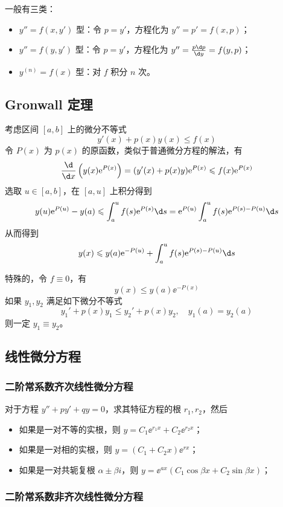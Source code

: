 一般有三类：

\begin{itemize}
	\item $y'' = f(x, y')$ 型：令 $p = y'$，方程化为 $y'' = p' = f(x, p)$；
	\item $y'' = f(y, y')$ 型：令 $p = y'$，方程化为 $y'' = \frac{p \d p}{\d y} = f(y, p)$；
	\item $y^{(n)} = f(x)$ 型：对 $f$ 积分 $n$ 次。
\end{itemize}

\subsection{Gronwall 定理}

考虑区间 $[a, b]$ 上的微分不等式
\[ y'(x) + p(x) y(x) \leqslant f(x) \]
令 $P(x)$ 为 $p(x)$ 的原函数，类似于普通微分方程的解法，有
\[ \frac{\d }{\d x} \left(y(x) \ee^{P(x)}\right) = (y'(x) + p(x) y) \ee^{P(x)} \leqslant f(x) \ee^{P(x)} \]
选取 $u \in [a, b]$，在 $[a, u]$ 上积分得到
\[ y(u) \ee^{P(u)} - y(a) \leqslant \int_{a}^{u} f(s) \ee^{P(s)} \d s = \ee^{P(u)} \int_{a}^{u} f(s) \ee^{P(s) - P(u)} \d s  \]
从而得到
\[ y(x) \leqslant y(a) \ee^{-P(u)} + \int_{a}^{u} f(s) \ee^{P(s) - P(u)} \d s \]

特殊的，令 $f \equiv 0$，有
\[ y(x) \leqslant y(a) \ee^{-P(x)} \]
如果 $y_1, y_2$ 满足如下微分不等式
\[ y_1' + p(x) y_1 \leqslant y_2' + p(x) y_2, \quad y_1(a) = y_2(a) \]
则一定 $y_1 \equiv y_2$。

\subsection{线性微分方程}

\subsubsection*{二阶常系数齐次线性微分方程}

对于方程 $y'' + py' + qy = 0$，求其特征方程的根 $r_1, r_2$，然后
\begin{itemize}
	\item 如果是一对不等的实根，则 $y = C_1 \ee^{r_1x} + C_2 \ee^{r_2 x}$；
	\item 如果是一对相的实根，则 $y = (C_1 + C_2 x) \ee^{rx}$；
	\item 如果是一对共轭复根 $\alpha \pm \beta i$，则 $y = \ee^{ax} (C_1 \cos \beta x + C_2 \sin \beta x)$；
\end{itemize}

\subsubsection*{二阶常系数非齐次线性微分方程}

